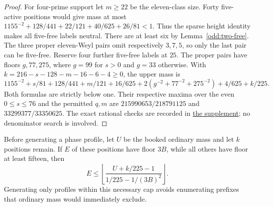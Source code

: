 \documentclass[11pt]{amsart}
\numberwithin{equation}{section}
\theoremstyle{definition}
\theoremstyle{plain}
\newcommand{\supfile}[2]{\href{run:rank-bound-supplement/#1}{#2}}
\begin{document}
\begin{proof}
For four-prime support let $m\ge22$ be the eleven-class size.
Forty five-active positions would give mass at most
$1155^{-2}+128/441+22/121+40/625+26/81<1$.
Thus the sparse height identity makes all five-free labels neutral.
There are at least six by Lemma~\ref{odd:two-free}. The three
proper eleven-Weyl pairs omit respectively $3,7,5$, so only the
last pair can be five-free. Reserve four further five-free labels
at $25$. The proper pairs have floors $g,77,275$, where $g=99$
for $s>0$ and $g=33$ otherwise. With
$k=216-s-128-m-16-6-4\ge0$, the upper mass is
\[
 1155^{-2}+s/81+128/441+m/121+16/625
       +2(g^{-2}+77^{-2}+275^{-2})+4/625+k/225.
\]
Both formulas are strictly below one. Their respective maxima over
the even $0\le s\le76$ and the permitted $q,m$ are
$215990653/218791125$ and $33299377/33350625$.
The exact rational checks are recorded in
\supfile{verification/odd_theory/check_edge37.py}{the supplement}; no denominator search is involved.
\end{proof}


Before generating a phase profile, let $U$ be the booked ordinary
mass and let $k$ positions remain. If $E$ of these positions have
floor $3B$, while all others have floor at least fifteen, then
\[
 E\le\left\lfloor
 \frac{U+k/225-1}{1/225-1/(3B)^2}\right\rfloor.
\]
Generating only profiles within this necessary cap avoids enumerating
prefixes that ordinary mass would immediately exclude.
\end{document}
